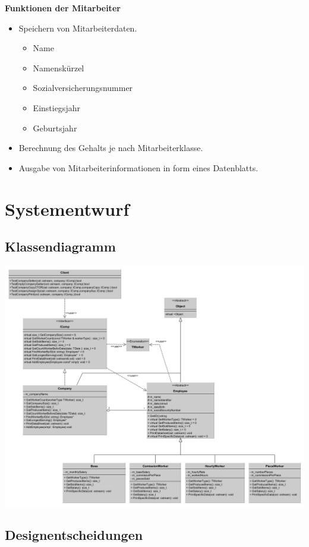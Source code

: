 \documentclass[12pt,naustrian,a4widepaper]{scrartcl}
\begin{document}
\textbf{Funktionen der Mitarbeiter}
\begin{itemize}
	\item Speichern von Mitarbeiterdaten.
	\begin{itemize}
		\item Name
		\item Namenskürzel
		\item Sozialversicherungsnummer
		\item Einstiegsjahr
		\item Geburtsjahr
	\end{itemize}
	\item Berechnung des Gehalts je nach Mitarbeiterklasse.
	\item Ausgabe von Mitarbeiterinformationen in form eines Datenblatts.
\end{itemize}

\clearpage
\section{Systementwurf}

\subsection{Klassendiagramm}
\includegraphics[width=14cm]{./Images/UML_Diagramm.png}
\newpage

\subsection{Designentscheidungen}
\end{document}
